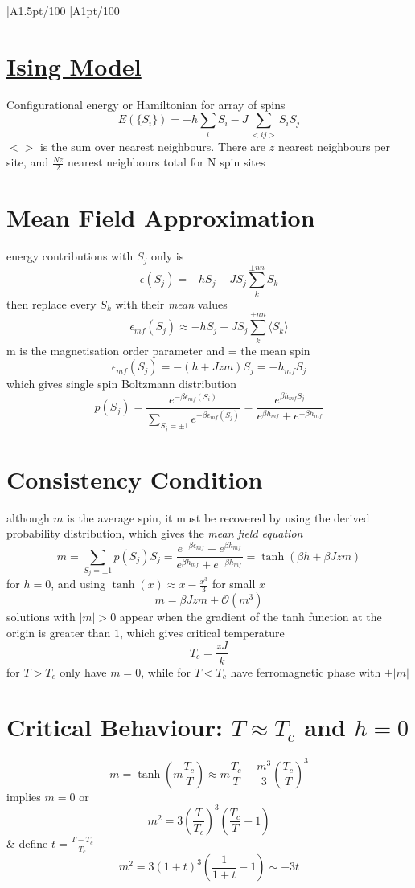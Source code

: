 \documentclass[table,cmyk]{article}
\makeatletter
\newcommand\ratio[2]{\strip@pt\dimexpr#1pt/#2\relax}
\makeatother
\begin{document}
\begin{longtable}
{
    |A{1.5}{\ratio{50}{100}}%
    |A{1}{\ratio{50}{100}}%
    |%
}\hline
\section*{\underline{Ising Model}}
Configurational energy or Hamiltonian for array of spins
\[E(\{S_i\}) = -h\sum_{i} S_i - J\sum_{<ij>}S_i S_j\]
$<>$ is the sum over nearest neighbours. There are $z$ nearest neighbours per site, and $\frac{Nz}{2}$ nearest neighbours total for N spin sites

\section{Mean Field Approximation}
energy contributions with $S_j$ only is 
\[\epsilon(S_j) = -hS_j - JS_j\sum_{k}^{\pm nn}S_k\]
then replace every $S_k$ with their \textit{mean} values
\[\epsilon_{mf}(S_j) \approx -hS_j - JS_j\sum_{k}^{\pm nn} \langle S_k\rangle\]
m is the magnetisation order parameter and = the mean spin
\[\epsilon_{mf}(S_j) = -(h+Jzm)S_j = -h_{mf}S_j\]
which gives single spin Boltzmann distribution
\[p(S_j) = \frac{e^{-\beta\epsilon_{mf}(S_i)}}{\sum_{S_j = \pm 1} e^{-\beta\epsilon_{mf}(S_j)}}=\frac{e^{\beta h_{mf}S_j}}{e^{\beta h_{mf}}+e^{-\beta h_{mf}}}\]
\section{Consistency Condition}
although $m$ is the average spin, it must be recovered by using the derived probability distribution, which gives the \textit{mean field equation}
\[ m = \sum_{S_j = \pm 1}p(S_j)S_j =  \frac{e^{-\beta\epsilon_{mf}} - e^{\beta h_{mf}}}{{e^{\beta h_{mf}}+e^{-\beta h_{mf}}}}=\tanh({\beta h+\beta Jzm})\]
for $h = 0$, and using $\tanh(x) \approx x - \frac{x^3}{3}$ for small $x$
\[ m = \beta Jzm + \mathcal{O}(m^3)\]
solutions with $|m| > 0$ appear when the gradient of the tanh function at the origin is greater than $1$, which gives critical temperature
\[ T_c = \frac{zJ}{k}\]
for $T>T_c$ only have $m=0$, while for $T<T_c$ have ferromagnetic phase with $\pm|m|$
\section*{Critical Behaviour: $T\approx T_c$ and $h=0$}
\[m=\tanh\left(m\frac{T_c}{T}\right) \approx m\frac{T_c}{T} - \frac{m^3}{3}\left(\frac{T_c}{T}\right)^3\]
implies $m=0$ or
\[ m^2 = 3\left(\frac{T}{T_c}\right)^3\left(\frac{T_c}{T}-1\right)\]
&
define $t = \frac{T-T_c}{T_c}$
\[m^2 = 3(1+t)^3\left(\frac{1}{1+t} - 1\right) \sim -3t\]


\end{longtable}
\end{document}
